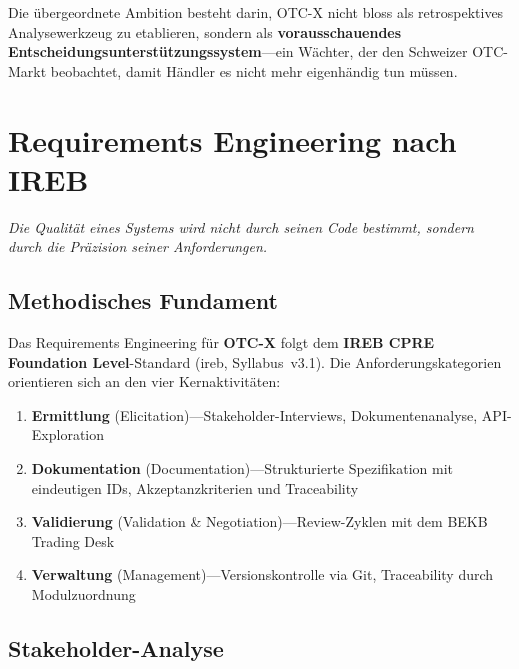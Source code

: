\documentclass[11pt, a4paper, oneside, openany]{report}
\newcommand{\term}[1]{\textcolor{SwissRed}{\sffamily\textbf{#1}}}
\begin{document}
\begin{insightbox}
Die übergeordnete Ambition besteht darin, OTC-X nicht bloss als retrospektives Analysewerkzeug zu etablieren, sondern als \textbf{vorausschauendes Entscheidungsunterstützungssystem}\;---\;ein Wächter, der den Schweizer OTC-Markt beobachtet, damit Händler es nicht mehr eigenhändig tun müssen.
\end{insightbox}


\chapter{Requirements Engineering nach IREB}
\label{ch:requirements}

\epigraph{\itshape Die Qualität eines Systems wird nicht durch seinen Code bestimmt, sondern durch die Präzision seiner Anforderungen.}{}

\section{Methodisches Fundament}

Das Requirements Engineering für \term{OTC-X} folgt dem \textbf{IREB CPRE Foundation Level}-Standard (\gls{ireb}, Syllabus~v3.1). Die Anforderungskategorien orientieren sich an den vier Kernaktivitäten:

\begin{enumerate}[label=\textcolor{SwissRed}{\textbf{\arabic*.}}]
  \item \textbf{Ermittlung} (Elicitation)\;---\;Stakeholder-Interviews, Dokumentenanalyse, API-Exploration
  \item \textbf{Dokumentation} (Documentation)\;---\;Strukturierte Spezifikation mit eindeutigen IDs, Akzeptanzkriterien und Traceability
  \item \textbf{Validierung} (Validation \& Negotiation)\;---\;Review-Zyklen mit dem BEKB Trading Desk
  \item \textbf{Verwaltung} (Management)\;---\;Versionskontrolle via Git, Traceability durch Modulzuordnung
\end{enumerate}

\section{Stakeholder-Analyse}
\end{document}
